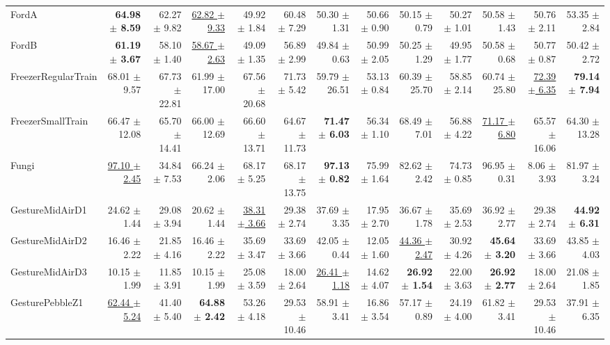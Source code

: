 \begin{landscape}
\begin{longtable}{lrrrrrrrrrrrr}
FordA & \textbf{64.98 $\pm$ 8.59} & 62.27 $\pm$ 9.82 & \underline{62.82 $\pm$ 9.33} & 49.92 $\pm$ 1.84 & 60.48 $\pm$ 7.29 & 50.30 $\pm$ 1.31 & 50.66 $\pm$ 0.90 & 50.15 $\pm$ 0.79 & 50.27 $\pm$ 1.01 & 50.58 $\pm$ 1.43 & 50.76 $\pm$ 2.11 & 53.35 $\pm$ 2.84 \\
FordB & \textbf{61.19 $\pm$ 3.67} & 58.10 $\pm$ 1.40 & \underline{58.67 $\pm$ 2.63} & 49.09 $\pm$ 1.35 & 56.89 $\pm$ 2.99 & 49.84 $\pm$ 0.63 & 50.99 $\pm$ 2.05 & 50.25 $\pm$ 1.29 & 49.95 $\pm$ 1.77 & 50.58 $\pm$ 0.68 & 50.77 $\pm$ 0.87 & 50.42 $\pm$ 2.72 \\
FreezerRegularTrain & 68.01 $\pm$ 9.57 & 67.73 $\pm$ 22.81 & 61.99 $\pm$ 17.00 & 67.56 $\pm$ 20.68 & 71.73 $\pm$ 5.42 & 59.79 $\pm$ 26.51 & 53.13 $\pm$ 0.84 & 60.39 $\pm$ 25.70 & 58.85 $\pm$ 2.14 & 60.74 $\pm$ 25.80 & \underline{72.39 $\pm$ 6.35} & \textbf{79.14 $\pm$ 7.94} \\
FreezerSmallTrain & 66.47 $\pm$ 12.08 & 65.70 $\pm$ 14.41 & 66.00 $\pm$ 12.69 & 66.60 $\pm$ 13.71 & 64.67 $\pm$ 11.73 & \textbf{71.47 $\pm$ 6.03} & 56.34 $\pm$ 1.10 & 68.49 $\pm$ 7.01 & 56.88 $\pm$ 4.22 & \underline{71.17 $\pm$ 6.80} & 65.57 $\pm$ 16.06 & 64.30 $\pm$ 13.28 \\
Fungi & \underline{97.10 $\pm$ 2.45} & 34.84 $\pm$ 7.53 & 66.24 $\pm$ 2.06 & 68.17 $\pm$ 5.25 & 68.17 $\pm$ 13.75 & \textbf{97.13 $\pm$ 0.82} & 75.99 $\pm$ 1.64 & 82.62 $\pm$ 2.42 & 74.73 $\pm$ 0.85 & 96.95 $\pm$ 0.31 & 8.06 $\pm$ 3.93 & 81.97 $\pm$ 3.24 \\
GestureMidAirD1 & 24.62 $\pm$ 1.44 & 29.08 $\pm$ 3.94 & 20.62 $\pm$ 1.44 & \underline{38.31 $\pm$ 3.66} & 29.38 $\pm$ 2.74 & 37.69 $\pm$ 3.35 & 17.95 $\pm$ 2.70 & 36.67 $\pm$ 1.78 & 35.69 $\pm$ 2.53 & 36.92 $\pm$ 2.77 & 29.38 $\pm$ 2.74 & \textbf{44.92 $\pm$ 6.31} \\
GestureMidAirD2 & 16.46 $\pm$ 2.22 & 21.85 $\pm$ 4.16 & 16.46 $\pm$ 2.22 & 35.69 $\pm$ 3.47 & 33.69 $\pm$ 3.66 & 42.05 $\pm$ 0.44 & 12.05 $\pm$ 1.60 & \underline{44.36 $\pm$ 2.47} & 30.92 $\pm$ 4.26 & \textbf{45.64 $\pm$ 3.20} & 33.69 $\pm$ 3.66 & 43.85 $\pm$ 4.03 \\
GestureMidAirD3 & 10.15 $\pm$ 1.99 & 11.85 $\pm$ 3.91 & 10.15 $\pm$ 1.99 & 25.08 $\pm$ 3.59 & 18.00 $\pm$ 2.64 & \underline{26.41 $\pm$ 1.18} & 14.62 $\pm$ 4.07 & \textbf{26.92 $\pm$ 1.54} & 22.00 $\pm$ 3.63 & \textbf{26.92 $\pm$ 2.77} & 18.00 $\pm$ 2.64 & 21.08 $\pm$ 1.85 \\
GesturePebbleZ1 & \underline{62.44 $\pm$ 5.24} & 41.40 $\pm$ 5.40 & \textbf{64.88 $\pm$ 2.42} & 53.26 $\pm$ 4.18 & 29.53 $\pm$ 10.46 & 58.91 $\pm$ 3.41 & 16.86 $\pm$ 3.54 & 57.17 $\pm$ 0.89 & 24.19 $\pm$ 4.00 & 61.82 $\pm$ 3.41 & 29.53 $\pm$ 10.46 & 37.91 $\pm$ 6.35 \\

\end{longtable}
\end{landscape}
